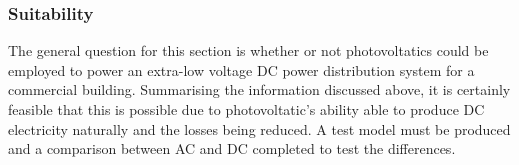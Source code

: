 
\subsubsection{Suitability}

The general question for this section is whether or not photovoltatics could be employed to power an extra-low voltage DC power distribution system for a commercial building. Summarising the information discussed above, it is certainly feasible that this is possible due to photovoltatic's ability able to produce DC electricity naturally and the losses being reduced. A test model must be produced and a comparison between AC and DC completed to test the differences.  
